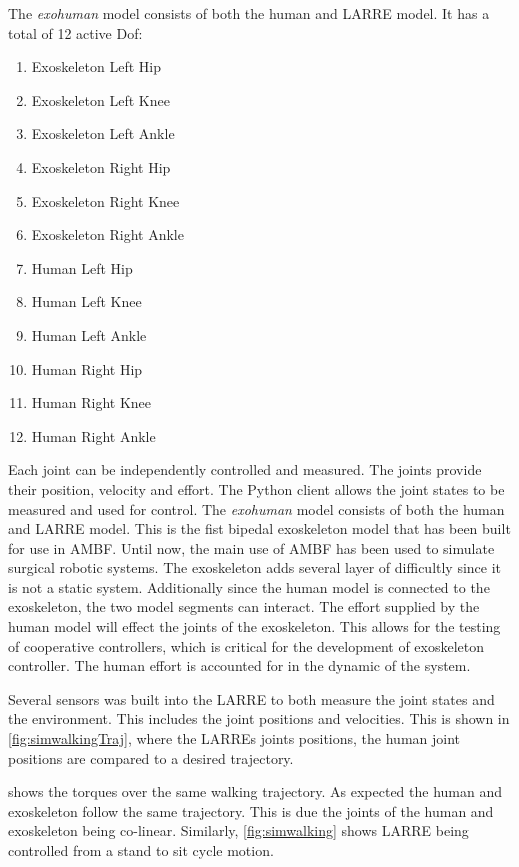  
 The \textit{exohuman} model consists of both the human and LARRE model. It has a total of 12 active Dof:

\begin{enumerate}
  \item Exoskeleton Left Hip
  \item Exoskeleton Left Knee
  \item Exoskeleton Left Ankle
  \item Exoskeleton Right Hip
  \item Exoskeleton Right Knee
  \item Exoskeleton Right Ankle
  \item Human Left Hip
  \item Human Left Knee
  \item Human Left Ankle
  \item Human Right Hip
  \item Human Right Knee
  \item Human Right Ankle
\end{enumerate}

 
 Each joint can be independently controlled and measured. The joints provide their position, velocity and effort. The Python client allows the joint states to be measured and used for control. The \textit{exohuman} model consists of both the human and LARRE model. This is the fist bipedal exoskeleton model that has been built for use in AMBF. Until now, the main use of AMBF has been used to simulate surgical robotic systems. The exoskeleton adds several layer of difficultly since it is not a static system. Additionally since the human model is connected to the exoskeleton, the two model segments can interact. The effort supplied by the human model will effect the joints of the exoskeleton. This allows for the testing of cooperative controllers, which is critical for the development of exoskeleton controller. The human effort is accounted for in the dynamic of the system.  
 
 
 
 
 Several sensors was built into the LARRE to both measure the joint states and the environment. This includes the joint positions and velocities. This is shown in \autoref{fig:simwalkingTraj}, where the LARREs joints positions, the human joint positions are compared to a desired trajectory.  \author{fig:simwalkingtorque} shows the torques over the same walking trajectory. As expected the human and exoskeleton follow the same trajectory. This is due the joints of the human and exoskeleton being co-linear.  Similarly, \autoref{fig:simwalking} shows LARRE being controlled from a stand to sit cycle motion.
 
